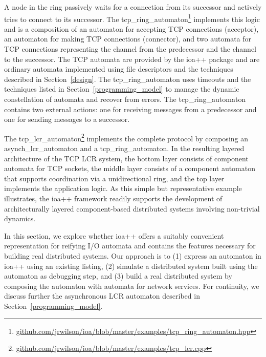 A node in the ring passively waits for a connection from its successor and actively tries to connect to its successor.
The tcp\_ring\_automaton\footnote{\url{github.com/jrwilson/ioa/blob/master/examples/tcp_ring_automaton.hpp}} implements this logic and is a composition of an automaton for accepting TCP connections (acceptor), an automaton for making TCP connections (connector), and two automata for TCP connections representing the channel from the predecessor and the channel to the successor.
The TCP automata are provided by the ioa++ package and are ordinary automata implemented using file descriptors and the techniques described in Section~\ref{design}.
The tcp\_ring\_automaton uses timeouts and the techniques listed in Section~\ref{programming_model} to manage the dynamic constellation of automata and recover from errors.
The tcp\_ring\_automaton contains two external actions:  one for receiving messages from a predecessor and one for sending messages to a successor.


The tcp\_lcr\_automaton\footnote{\url{github.com/jrwilson/ioa/blob/master/examples/tcp_lcr.cpp}} implements the complete protocol by composing an asynch\_lcr\_automaton and a tcp\_ring\_automaton.
In the resulting layered architecture of the TCP LCR system, the bottom layer consists of component automata for TCP sockets, the middle layer consists of a component automaton that supports coordination via a unidirectional ring, and the top layer implements the application logic.
As this simple but representative example illustrates, the ioa++ framework readily supports the development of architecturally layered component-based distributed systems involving non-trivial dynamics.


\ifjournal
In this section, we explore whether ioa++ offers a suitably convenient representation for reifying I/O automata and contains the features necessary for building real distributed systems.
Our approach is to (1) express an automaton in ioa++ using an existing listing, (2) simulate a distributed system built using the automaton as debugging step, and (3) build a real distributed system by composing the automaton with automata for network services.
For continuity, we discuss further the asynchronous LCR automaton described in Section~\ref{programming_model}.


